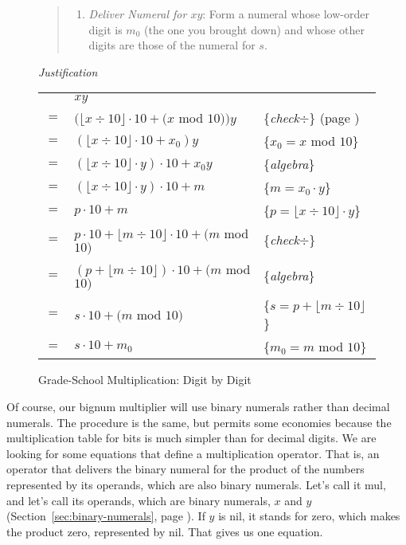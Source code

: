 \begin{figure}
\begin{quote}
\begin{enumerate}
\item \emph{Deliver Numeral for $x y$}:
Form a numeral whose low-order digit is $m_0$ (the one you brought down)
and whose other digits are those of the numeral for $s$.
\end{enumerate}
\end{quote}

\emph{Justification}
\begin{center}
\begin{tabular}{cll}
    & $x y$ & \\
$=$ & $(\lfloor x \div 10\rfloor \cdot 10 + (x$ mod $10)) y$  & \{\emph{check}$\div$\} (page \pageref{third-grade-division})\\
$=$ & $(\lfloor x \div 10\rfloor \cdot 10 + x_0) y$           & \{$x_0=x$ mod $10$\}\\
$=$ & $(\lfloor x \div 10\rfloor \cdot y) \cdot 10 + x_0 y$   & \{\emph{algebra}\} \\
$=$ & $(\lfloor x \div 10\rfloor \cdot y) \cdot 10 + m$       & \{$m=x_0\cdot y$\} \\
$=$ & $p \cdot 10 + m$                                        & \{$p=\lfloor x \div 10\rfloor \cdot y$\} \\
$=$ & $p \cdot 10 + \lfloor m \div 10 \rfloor \cdot 10 + (m$ mod $10)$& \{\emph{check}$\div$\} \\
$=$ & $(p + \lfloor m \div 10 \rfloor) \cdot 10 + (m$ mod $10)$       & \{\emph{algebra}\} \\
$=$ & $s \cdot 10 + (m$ mod $10)$                             & \{$s=p + \lfloor m \div 10 \rfloor$\} \\
$=$ & $s \cdot 10 + m_0$                                      & \{$m_0=m$ mod $10$\} \\
\end{tabular}
\end{center}
\label{multiplication!grade school}
\caption{Grade-School Multiplication: Digit by Digit}
\label{fig:grade-school-mult}
\end{figure}

Of course, our bignum multiplier
will use binary numerals rather than decimal numerals.
The procedure is the same, but permits some economies
because the multiplication table for bits is much simpler
than for decimal digits.
We are looking for some equations that define a multiplication operator.
That is, an operator that delivers the binary numeral for the product of the numbers
represented by its operands, which are also binary numerals.
Let's call it mul, and let's call its operands, which are binary numerals,
$x$ and $y$ (Section~\ref{sec:binary-numerals}, page \pageref{sec:binary-numerals}).
If $y$ is nil, it stands for zero, which makes the product zero, represented by nil.
That gives us one equation.

